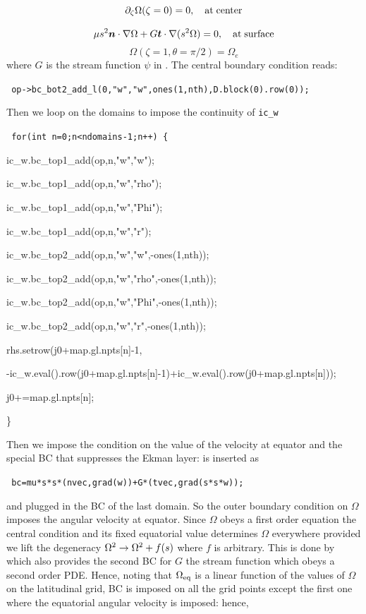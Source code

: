 \[ \partial_\zeta\Omega(\zeta=0) = 0,\quad {\rm at\; center} \]

\[ \mu s^2\vn\cdot\na\Omega +
G\vec{t}\cdot\na(s^2\Omega)=0,\quad {\rm at\; surface} \]
\[ \Omega(\zeta=1,\theta=\pi/2) = \Omega_e\]
where $G$ is the stream function $\psi$ in .
The central boundary condition reads:
\bigskip

\centerline{\tt
op->bc\_bot2\_add\_l(0,"w","w",ones(1,nth),D.block(0).row(0));}
\bigskip

Then we loop on the domains to impose the continuity of {\tt ic\_w}

\begin{center}
{\tt
        for(int n=0;n<ndomains-1;n++) \{  \par
                ic\_w.bc\_top1\_add(op,n,"w","w");  \par
                ic\_w.bc\_top1\_add(op,n,"w","rho");  \par
                ic\_w.bc\_top1\_add(op,n,"w","Phi");  \par
                ic\_w.bc\_top1\_add(op,n,"w","r");  \par
                ic\_w.bc\_top2\_add(op,n,"w","w",-ones(1,nth));  \par
                ic\_w.bc\_top2\_add(op,n,"w","rho",-ones(1,nth));  \par
                ic\_w.bc\_top2\_add(op,n,"w","Phi",-ones(1,nth));  \par
                ic\_w.bc\_top2\_add(op,n,"w","r",-ones(1,nth));  \par
                rhs.setrow(j0+map.gl.npts[n]-1,  \par
-ic\_w.eval().row(j0+map.gl.npts[n]-1)+ic\_w.eval().row(j0+map.gl.npts[n]));\par
  \par
                j0+=map.gl.npts[n];  \par
        \}  \par
}
\end{center}

\bigskip
Then we impose the condition on the value of the velocity at equator and
the special BC that suppresses the Ekman layer:
 is inserted as

\bigskip
\centerline{\tt
bc=mu*s*s*(nvec,grad(w))+G*(tvec,grad(s*s*w));
}

\bigskip
\noindent and plugged in the BC of the last domain. So the outer
boundary condition on $\Omega$ imposes the angular velocity at
equator. Since $\Omega$ obeys a first order equation the central
condition and its fixed equatorial value determines $\Omega$ everywhere
provided we lift the degeneracy $\Omega^2\rightarrow\Omega^2+f(s)$ where $f$ is
arbitrary. This is done by  which also provides the second BC
for $G$ the stream function which obeys a second order PDE. Hence,
noting that $\Omega_{\rm eq}$ is a linear function of the values of
$\Omega$ on the latitudinal grid, BC  is imposed on all the
grid points except the first one where the equatorial angular velocity
is imposed: hence,

